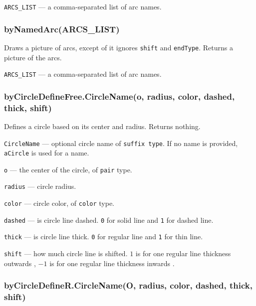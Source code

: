 \documentclass{ltxdoc}
\begin{document}
	\texttt{ARCS\_LIST} — a comma-separated list of arc names.
	
\subsubsection{byNamedArc(ARCS\_LIST)}\label{byNamedArc}
	Draws a picture of arcs, except of it ignores \texttt{shift} and \texttt{endType}. Returns a picture of the arcs.
	
	\texttt{ARCS\_LIST} — a comma-separated list of arc names.


\subsubsection{byCircleDefineFree.CircleName(o, radius, color, dashed, thick, shift)}\label{byCircleDefineFree}
	
	Defines a circle based on its center and radius. Returns nothing.
	
	
	\texttt{CircleName} — optional circle name of \texttt{suffix type}. If no name is provided, \texttt{aCircle} is used for a name.
	
	\texttt{o} — the center of the circle, of \texttt{pair} type.
	
	\texttt{radius} — circle radius.
	
	\texttt{color} — circle color, of \texttt{color} type.
	
	\texttt{dashed} — is circle line dashed. \texttt{0} for solid line and \texttt{1} for dashed line.
	
	\texttt{thick} — is circle line thick. \texttt{0} for regular line and \texttt{1} for thin line.
	
	\texttt{shift} — how much circle line is shifted. \texttt{$1$} is for one regular line thickness outwards
	, \texttt{$-1$} is for one regular line thickness inwards
	.

\subsubsection{byCircleDefineR.CircleName(O, radius, color, dashed, thick, shift)}\label{byCircleDefineR}
	
\end{document}
